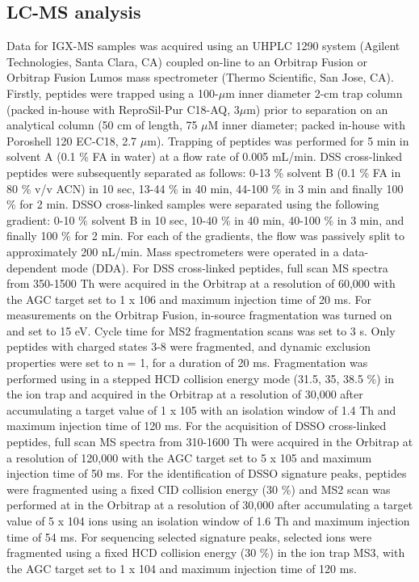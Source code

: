 \subsection*{LC-MS analysis}
Data for IGX-MS samples was acquired using an UHPLC 1290 system (Agilent Technologies, Santa Clara, CA) coupled on-line to an Orbitrap Fusion or Orbitrap Fusion Lumos mass spectrometer (Thermo Scientific, San Jose, CA). Firstly, peptides were trapped using a 100-$\mu$m inner diameter 2-cm trap column (packed in-house with ReproSil-Pur C18-AQ, 3$\mu$m) prior to separation on an analytical column (50 cm of length, 75 $\mu$M inner diameter; packed in-house with Poroshell 120 EC-C18, 2.7 $\mu$m). Trapping of peptides was performed for 5 min in solvent A (0.1 \% FA in water) at a flow rate of 0.005 mL/min. DSS cross-linked peptides were subsequently separated as follows: 0-13 \% solvent B (0.1 \% FA in 80 \% v/v ACN) in 10 sec, 13-44 \% in 40 min, 44-100 \% in 3 min and finally 100 \% for 2 min. DSSO cross-linked samples were separated using the following gradient: 0-10 \% solvent B in 10 sec, 10-40 \% in 40 min, 40-100 \% in 3 min, and finally 100 \% for 2 min. For each of the gradients, the flow was passively split to approximately 200 nL/min. Mass spectrometers were operated in a data-dependent mode (DDA). For DSS cross-linked peptides, full scan MS spectra from 350-1500 Th were acquired in the Orbitrap at a resolution of 60,000 with the AGC target set to 1 x 106 and maximum injection time of 20 ms. For measurements on the Orbitrap Fusion, in-source fragmentation was turned on and set to 15 eV. Cycle time for MS2 fragmentation scans was set to 3 s. Only peptides with charged states 3-8 were fragmented, and dynamic exclusion properties were set to n = 1, for a duration of 20 ms. Fragmentation was performed using in a stepped HCD collision energy mode (31.5, 35, 38.5 \%) in the ion trap and acquired in the Orbitrap at a resolution of 30,000 after accumulating a target value of 1 x 105 with an isolation window of 1.4 Th and maximum injection time of 120 ms. For the acquisition of DSSO cross-linked peptides, full scan MS spectra from 310-1600 Th were acquired in the Orbitrap at a resolution of 120,000 with the AGC target set to 5 x 105 and maximum injection time of 50 ms. For the identification of DSSO signature peaks, peptides were fragmented using a fixed CID collision energy (30 \%) and MS2 scan was performed at in the Orbitrap at a resolution of 30,000 after accumulating a target value of 5 x 104 ions using an isolation window of 1.6 Th and maximum injection time of 54 ms. For sequencing selected signature peaks, selected ions were fragmented using a fixed HCD collision energy (30 \%) in the ion trap MS3, with the AGC target set to 1 x 104 and maximum injection time of 120 ms.
